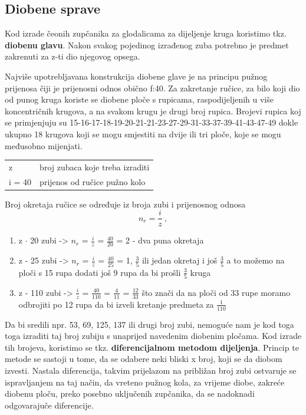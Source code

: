 \documentclass[a4paper,12pt]{article}
\numberwithin{figure}{section}
\begin{document}
\subsection{Diobene sprave}
Kod izrade čeonih zupčanika za glodalicama za dijeljenje kruga koristimo tkz. \textbf{diobenu glavu}. Nakon svakog pojedinog izrađenog zuba potrebno je predmet zakrenuti za z-ti dio njegovog opsega.\par
Najviše upotrebljavana konstrukcija diobene glave je na principu pužnog prijenosa čiji je prijenosni odnos obično f:40. Za zakretanje ručice, za bilo koji dio od punog kruga koriste se diobene ploče s rupicama, raspodijeljenih u više koncentričnih krugova, a na svakom krugu je drugi broj rupica. Brojevi rupica koj se primjenjuju su 15-16-17-18-19-20-21-21-23-27-29-31-33-37-39-41-43-47-49 dokle ukupno 18 krugova koji se mogu smjestiti na dvije ili tri ploče, koje se mogu međusobno mijenjati.
\begin{table}[]
\centering
\begin{tabular}{ll}
z      & broj zubaca koje treba izraditi \\
i = 40 & prijenos od ručice pužno kolo  
\end{tabular}
\end{table}
\FloatBarrier
Broj okretaja ručice se određuje iz broja zubi i prijenosnog odnosa
\begin{equation}
n_{r} = \frac{i}{z}\:,
\end{equation}
\begin{enumerate}
\item z $\cdot$ 20 zubi -> $\displaystyle{n_{r}}$ = $\displaystyle{\frac{i}{z}}$ = $\displaystyle{\frac{40}{20}}$ = 2 - dva puna okretaja
\item z - 25 zubi -> $n_{r}$ = $\displaystyle{\frac{i}{z}}$ = $\displaystyle{\frac{40}{25}}$ = 1, $\displaystyle{\frac{3}{5}}$ ili jedan okretaj i još $\displaystyle{\frac{3}{5}}$ a to možemo na ploči s 15 rupa dodati još 9 rupa da bi prošli $\displaystyle{\frac{3}{5}}$ kruga
\item z - 110 zubi -> $\displaystyle{\frac{i}{z}}$ = $\displaystyle{\frac{40}{110}}$ = $\displaystyle{\frac{4}{11}}$ = $\displaystyle{\frac{12}{33}}$ što znači da na ploči od 33 rupe moramo odbrojiti po 12 rupa da bi izveli kretanje predmeta za $\displaystyle{\frac{1}{110}}$
\end{enumerate}
Da bi sredili npr. 53, 69, 125, 137 ili drugi broj zubi, nemoguće nam je kod toga toga izraditi taj broj zubiju s unaprijed navedenim diobenim pločama. Kod izrade tih brojeva, koristimo se tkz. \textbf{diferencijalnom metodom dijeljenja}. Princip te metode se sastoji u tome, da se odabere neki bliski x broj, koji se da diobom izvesti. Nastala diferencija, takvim prijelazom na približan broj zubi ostvaruje se ispravljanjem na taj način, da vreteno pužnog kola, za vrijeme diobe, zakreće diobenu ploču, preko posebno uključenih zupčanika, da se nadoknadi odgovarajuče diferencije.
\end{document}
